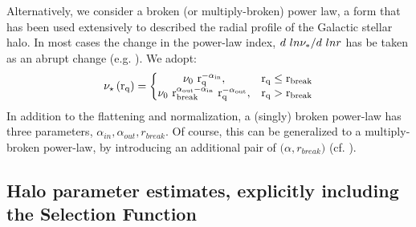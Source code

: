 \documentclass[12pt,preprint]{aastex}
\begin{document}
Alternatively, we consider a broken (or multiply-broken) power law, a form that has been used extensively to described the radial profile of the Galactic stellar halo\citep{Saha1985,Sesar2011,Deason2011,Deason2014}. In most cases the change in the power-law index, 
$d~ln\nu_*/d\\~ln r$ has be taken as an abrupt change (e.g. \citet{Deason2011}). We adopt:
\begin{equation}
\rm \nu_\star\left(r_q \right )= \left\{\begin{matrix} \rm \nu_0~r_q^{-\alpha_{in}}, & \rm r_q\leq r_{break} \\ \rm \nu_0~r_{break}^{\alpha_{out}-\alpha_{in}}~r_q^{-\alpha_{out}},&\rm r_q>r_{break} \end{matrix}\right.
\end{equation}
In addition to the flattening and normalization, a (singly) broken power-law has three parameters,
$\alpha_{in}, \alpha_{out}, r_{break}$. Of course, this can be generalized to a multiply-broken
power-law, by introducing an additional pair of $\bigl ( \alpha, r_{break} \bigr )$ (cf. \citet{Deason2014}).

\subsection{Halo parameter estimates, explicitly including the Selection Function}
\end{document}

